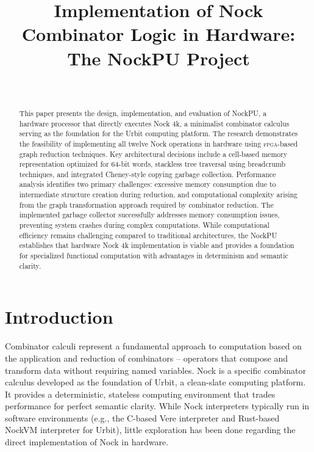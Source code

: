 \documentclass[twoside]{article}
\title{Implementation of Nock Combinator Logic in Hardware: The NockPU Project}
\author{\authorpatp \\ \affiliation}
\date{}
\begin{document}
\maketitle
\thispagestyle{firststyle}

\begin{abstract}
\sloppy
This paper presents the design, implementation, and evaluation of NockPU, a hardware processor that directly executes Nock 4k, a minimalist combinator calculus serving as the foundation for the Urbit computing platform. The research demonstrates the feasibility of implementing all twelve Nock operations in hardware using \textsc{fpga}-based graph reduction techniques. Key architectural decisions include a cell-based memory representation optimized for 64-bit words, stackless tree traversal using breadcrumb techniques, and integrated Cheney-style copying garbage collection. Performance analysis identifies two primary challenges: excessive memory consumption due to intermediate structure creation during reduction, and computational complexity arising from the graph transformation approach required by combinator reduction. The implemented garbage collector successfully addresses memory consumption issues, preventing system crashes during complex computations. While computational efficiency remains challenging compared to traditional architectures, the NockPU establishes that hardware Nock 4k implementation is viable and provides a foundation for specialized functional computation with advantages in determinism and semantic clarity.
\end{abstract}

\setcounter{page}{1}

\tableofcontents

\section{Introduction}

Combinator calculi represent a fundamental approach to computation based on the application and reduction of combinators -- operators that compose and transform data without requiring named variables. Nock is a specific combinator calculus developed as the foundation of Urbit, a clean-slate computing platform. It provides a deterministic, stateless computing environment that trades performance for perfect semantic clarity. While Nock interpreters typically run in software environments (e.g., the C-based Vere interpreter and Rust-based NockVM interpreter for Urbit), little exploration has been done regarding the direct implementation of Nock in hardware.
\end{document}
